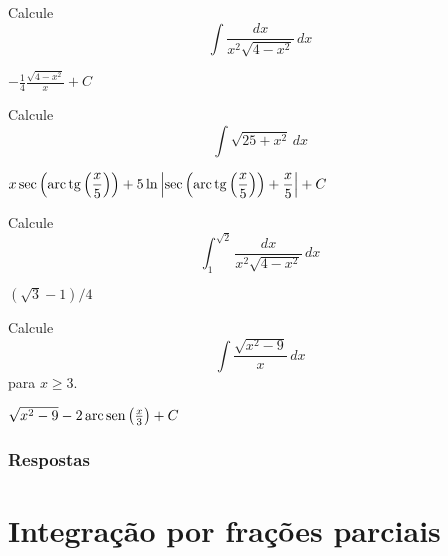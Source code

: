 \begin{exer}
  Calcule
  \begin{equation}
    \int\frac{dx}{x^2\sqrt{4-x^2}}\,dx
  \end{equation}
\end{exer}
\begin{resp}
  $-\frac{1}{4}\frac{\sqrt{4-x^2}}{x} + C$
\end{resp}

\begin{exer}
  Calcule
  \begin{equation}
    \int\sqrt{25+x^2}\,dx
  \end{equation}
\end{exer}
\begin{resp}
  $\displaystyle x\sec\left(\operatorname{arc}\operatorname{tg}\left(\frac{x}{5}\right)\right) + 5\ln\left|\sec\left(\operatorname{arc}\operatorname{tg}\left(\frac{x}{5}\right)\right) + \frac{x}{5}\right| + C$
\end{resp}

\begin{exer}
  Calcule
  \begin{equation}
    \int_1^{\sqrt{2}}\frac{dx}{x^2\sqrt{4-x^2}}\,dx
  \end{equation}
\end{exer}
\begin{resp}
  $(\sqrt{3}-1)/4$
\end{resp}

\begin{exer}
  Calcule
  \begin{equation}
    \int\frac{\sqrt{x^2-9}}{x}\,dx
  \end{equation}
  para $x \geq 3$.
\end{exer}
\begin{resp}
  $\sqrt{x^2-9} - 2\operatorname{arc}\operatorname{sen}\left(\frac{x}{3}\right) + C$
\end{resp}

\ifisbook
\subsubsection{Respostas}
\shipoutAnswer
\fi


\section{Integração por frações parciais}\label{cap_int_sec_frapar}

